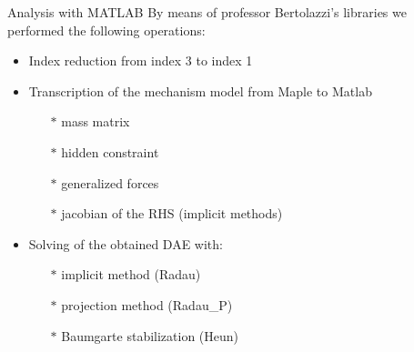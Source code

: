 \documentclass{beamer}              %
\begin{document}
	\begin{frame}{Analysis with MATLAB}
		\small
		By means of professor Bertolazzi's libraries we performed the following operations:
		\begin{itemize}
			\item Index reduction from index 3 to index 1 
			\item Transcription of the mechanism model from Maple to Matlab
			\begin{itemize}
				\item[$\ast$]  mass matrix 
				\item[$\ast$]  hidden constraint
				\item[$\ast$]  generalized forces
				\item[$\ast$]  jacobian of the RHS (implicit methods)
			\end{itemize}
		    \item Solving of the obtained DAE with:
		    \begin{itemize}
		    	\item[$\ast$]  implicit method (Radau) 
		    	\item[$\ast$]  projection method (Radau\_P)
		    	\item[$\ast$]  Baumgarte stabilization (Heun)
		    \end{itemize}
		\end{itemize}
	\end{frame}
\end{document}
